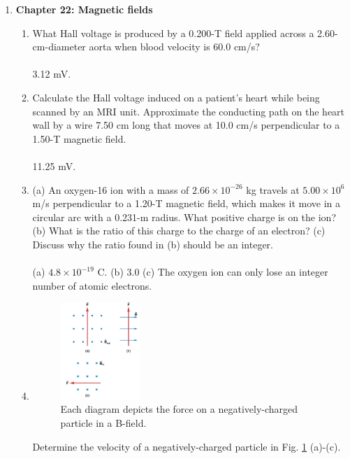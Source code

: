 \documentclass[10pt]{article}
\begin{document}
\begin{enumerate}
\begin{enumerate}
(a) The circuit diagram is a simple in-series circuit containing one voltage source and a total resistance consisting of the internal resistance of the power supply, and the resistance of the human being.  (b) I = 1.67 A (c) 33 kW (he gonna die.) (d) 20 M$\Omega$
\end{enumerate}
\item \textbf{Chapter 22: Magnetic fields}
\begin{enumerate}
\item What Hall voltage is produced by a 0.200-T field applied across a 2.60-cm-diameter aorta when blood velocity is 60.0 cm/s? \\ \\
3.12 mV.
\item Calculate the Hall voltage induced on a patient’s heart while being scanned by an MRI unit. Approximate the conducting path on the heart wall by a wire 7.50 cm long that moves at 10.0 cm/s perpendicular to a 1.50-T magnetic field. \\ \\
11.25 mV.
\item (a) An oxygen-16 ion with a mass of $2.66 \times 10^{-26}$ kg travels at $5.00 \times 10^{6}$ m/s perpendicular to a 1.20-T magnetic field, which makes it move in a circular arc with a 0.231-m radius. What positive charge is on the ion? (b) What is the ratio of this charge to the charge of an electron? (c) Discuss why the ratio found in (b) should be an integer. \\ \\
(a) $4.8 \times 10^{-19}$ C. (b) 3.0 (c) The oxygen ion can only lose an integer number of atomic electrons.
\item 
\begin{figure}[ht]
\centering
\includegraphics[width=0.3\textwidth]{lorentz1.png}
\caption{\label{fig:lorentz1} Each diagram depicts the force on a negatively-charged particle in a B-field.}
\end{figure}
Determine the velocity of a negatively-charged particle in Fig. \ref{fig:lorentz1} (a)-(c). \\ \\

\end{enumerate}
\end{enumerate}
\end{document}
